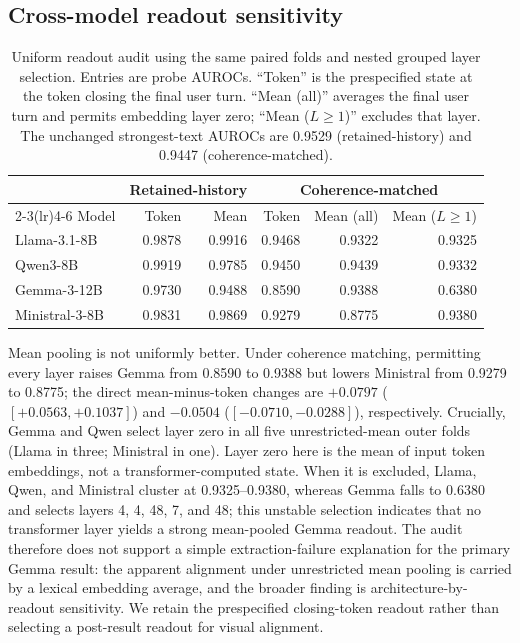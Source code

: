\documentclass{article}
\begin{document}
\FloatBarrier
\subsection{Cross-model readout sensitivity}
\label{app:readout-sensitivity}

\begin{table}[h]
  \caption{Uniform readout audit using the same paired folds and nested grouped
  layer selection. Entries are probe AUROCs. ``Token'' is the prespecified state
  at the token closing the final user turn. ``Mean (all)'' averages the final
  user turn and permits embedding layer zero; ``Mean ($L\geq1$)'' excludes that
  layer. The unchanged strongest-text AUROCs are 0.9529 (retained-history) and
  0.9447 (coherence-matched).}
  \label{tab:appendix-readout}
  \centering
  \scriptsize
  \setlength{\tabcolsep}{2.8pt}
  \begin{tabular}{lrr@{\qquad}rrr}
    \toprule
      & \multicolumn{2}{c}{Retained-history} & \multicolumn{3}{c}{Coherence-matched} \\
    \cmidrule(lr){2-3}\cmidrule(lr){4-6}
    Model & Token & Mean & Token & Mean (all) & Mean ($L\geq1$) \\
    \midrule
    Llama-3.1-8B & 0.9878 & 0.9916 & 0.9468 & 0.9322 & 0.9325 \\
    Qwen3-8B & 0.9919 & 0.9785 & 0.9450 & 0.9439 & 0.9332 \\
    Gemma-3-12B & 0.9730 & 0.9488 & 0.8590 & 0.9388 & 0.6380 \\
    Ministral-3-8B & 0.9831 & 0.9869 & 0.9279 & 0.8775 & 0.9380 \\
    \bottomrule
  \end{tabular}
\end{table}

Mean pooling is not uniformly better. Under coherence matching, permitting every
layer raises Gemma from 0.8590 to 0.9388 but lowers Ministral from 0.9279 to
0.8775; the direct mean-minus-token changes are $+0.0797$
($[+0.0563,+0.1037]$) and $-0.0504$ ($[-0.0710,-0.0288]$), respectively.
Crucially, Gemma and Qwen select layer zero in all five unrestricted-mean outer
folds (Llama in three; Ministral in one). Layer zero here is the mean of input
token embeddings, not a transformer-computed state. When it is excluded,
Llama, Qwen, and Ministral cluster at 0.9325--0.9380, whereas Gemma falls to
0.6380 and selects layers 4, 4, 48, 7, and 48; this unstable selection
indicates that no transformer layer yields a strong mean-pooled Gemma readout. The audit therefore does not
support a simple extraction-failure explanation for the primary Gemma result:
the apparent alignment under unrestricted mean pooling is carried by a lexical
embedding average, and the broader finding is architecture-by-readout
sensitivity. We retain the prespecified closing-token readout rather than
selecting a post-result readout for visual alignment.
\end{document}
